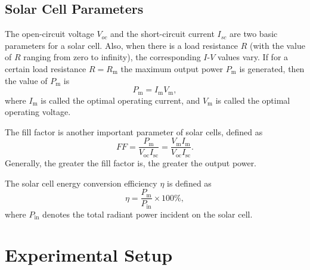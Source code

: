 \documentclass{article}
\begin{document}
\subsection*{Solar Cell Parameters}

The open-circuit voltage $V_{oc}$ and the short-circuit current $I_{sc}$ are two basic parameters for a solar cell. Also, when there is a load resistance $R$ (with the value of $R$ ranging from zero to infinity), the corresponding $I$-$V$ values vary. If for a certain load resistance $R = R_\text{m}$ the maximum output power $P_\text{m}$ is generated, then the value of $P_\text{m}$ is
$$P_\text{m} = I_\text{m}V_\text{m},$$
where $I_\text{m}$ is called the optimal operating current, and $V_\text{m}$ is called the optimal operating voltage.

The fill factor is another important parameter of solar cells, defined as
\begin{equation}
    FF = \frac{P_\text{m}}{V_{\text{oc}}I_{\text{sc}}} = \frac{V_\text{m}I_{\text{m}}}{V_{\text{oc}}I_{\text{sc}}}.
    \label{eq:FF}
\end{equation}
Generally, the greater the fill factor is, the greater the output power.

The solar cell energy conversion efficiency $\eta$ is defined as
\begin{equation}
    \eta = \frac{P_\text{m}}{P_{\text{in}}}\times 100\%,
    \label{eq:efficiency}
\end{equation}
where $P_{\text{in}}$ denotes the total radiant power incident on the solar cell.

\section{Experimental Setup}
\end{document}
